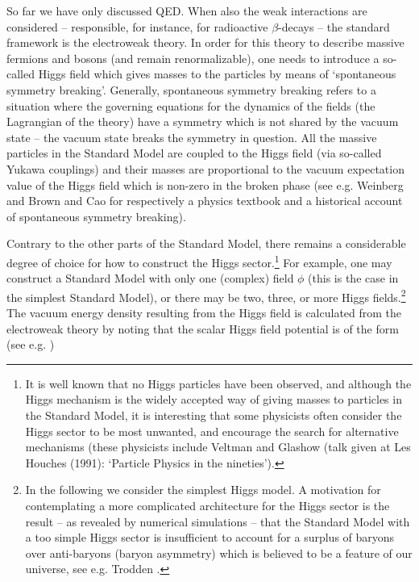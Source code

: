 \documentclass[12pt]{article}
\begin{document}
So far we have only discussed QED. When also the weak
interactions are considered -- responsible, for instance, for
radioactive $\beta$-decays -- the standard framework is the
electroweak theory. In order for this theory to describe massive
fermions and bosons (and remain renormalizable), one needs to
introduce a so-called Higgs field which gives masses to the
particles by means of `spontaneous symmetry breaking'. Generally,
spontaneous symmetry breaking refers to a situation where the
governing equations for the dynamics of the fields (the Lagrangian
of the theory) have a symmetry which is not shared by the vacuum
state -- the vacuum state breaks the symmetry in question. All the
massive particles in the Standard Model are coupled to the Higgs
field (via so-called Yukawa couplings) and their masses are
proportional to the vacuum expectation value of the Higgs field
which is non-zero in the broken phase (see e.g. Weinberg
\cite{weinberg96} and Brown and Cao \cite{brown91} for
respectively a physics textbook and a historical account of
spontaneous symmetry breaking).

Contrary to the other parts of the Standard Model, there remains
a considerable degree of choice for how to construct the Higgs 
sector.\footnote{It is well known that no Higgs particles have been
observed, and although the Higgs mechanism is the widely accepted 
way of giving masses to particles in the Standard Model, it is 
interesting that some physicists often consider the Higgs sector to be 
most unwanted, and encourage the search for alternative mechanisms
(these physicists include Veltman \cite{veltman86} and Glashow (talk
given at Les Houches (1991): `Particle Physics in the nineties').} 
For example, one may construct a Standard Model with
only one (complex) field $\phi$ (this is the case
in the simplest Standard Model), or there may be two, three, or
more Higgs fields.\footnote{In the following we consider the
simplest Higgs model. A motivation for contemplating a more
complicated architecture for the Higgs sector is the result -- as
revealed by numerical simulations -- that the Standard Model with a too
simple Higgs sector is insufficient to account for a surplus of
baryons over anti-baryons (baryon asymmetry) which is believed
to be a feature of our universe, see e.g.  Trodden \cite{trodden98}.}
The vacuum energy density resulting from the Higgs field is calculated
from the electroweak theory by noting that the scalar Higgs field
potential is of the form (see e.g. \cite{Weinberg89})
\end{document}
